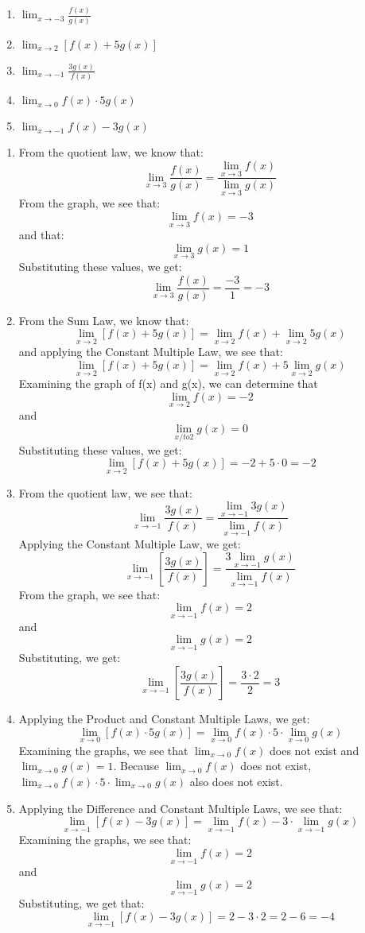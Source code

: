 \begin{Exercise}
    [title = Limits Practice 6, label=limits6]
\begin{enumerate}
    \item $\lim_{x\to-3} \frac{f(x)}{g(x)}$
    \item $\lim_{x\to2}\left[f(x) + 5g(x)\right]$
    \item $\lim_{x\to-1} \frac{3g(x)}{f(x)}$
    \item $\lim_{x\to0}f(x) \cdot 5g(x)$
    \item $\lim_{x\to-1} f(x) - 3g(x) $
\end{enumerate}
\end{Exercise}
\begin{Answer}
    [ref=limits6]
    \begin{enumerate}
        \item From the quotient law, we know that:$$\lim_{x\to3}\frac{f(x)}{g(x)}=\frac{\lim_{x\to3}f(x)}{\lim_{x\to3}g(x)}$$ From the graph, we see that: $$\lim_{x\to3}f(x) = -3$$ and that:$$\lim_{x\to3}g(x) = 1$$ Substituting these values, we get: $$\lim_{x\to3}\frac{f(x)}{g(x)}=\frac{-3}{1} = -3$$
        \item From the Sum Law, we know that: $$\lim_{x\to2}\left[f(x) + 5g(x)\right]=\lim_{x\to2}f(x) + \lim_{x\to2}5g(x)$$ and applying the Constant Multiple Law, we see that: $$\lim_{x\to2}\left[f(x) + 5g(x)\right]=\lim_{x\to2}f(x) + 5\lim_{x\to2}g(x)$$ Examining the graph of f(x) and g(x), we can determine that $$\lim_{x\to2}f(x) = -2$$ and $$\lim_{x/to2}g(x) = 0$$ Substituting these values, we get: $$\lim_{x\to2}\left[f(x) + 5g(x)\right]=-2 + 5 \cdot 0 = -2$$
        \item From the quotient law, we see that: $$\lim_{x\to-1} \frac{3g(x)}{f(x)}=\frac{\lim_{x\to-1}3g(x)}{\lim_{x\to-1}f(x)}$$ Applying the Constant Multiple Law, we get: $$\lim_{x\to-1} \left[\frac{3g(x)}{f(x)}\right]=\frac{3\lim_{x\to-1}g(x)}{\lim_{x\to-1}f(x)}$$ From the graph, we see that: $$\lim_{x\to-1}f(x) = 2$$ and $$\lim_{x\to-1}g(x) = 2$$ Substituting, we get: $$\lim_{x\to-1} \left[\frac{3g(x)}{f(x)}\right]=\frac{3 \cdot 2}{2}=3$$
        \item Applying the Product and Constant Multiple Laws, we get: $$\lim_{x\to0}\left[f(x) \cdot 5g(x)\right] = \lim_{x\to0}f(x) \cdot 5 \cdot \lim_{x\to0}g(x)$$ Examining the graphs, we see that $\lim_{x\to0}f(x)$ does not exist and $\lim_{x\to0}g(x) = 1$. Because $\lim_{x\to0}f(x)$ does not exist, $\lim_{x\to0}f(x) \cdot 5 \cdot \lim_{x\to0}g(x)$ also does not exist. 
        \item Applying the Difference and Constant Multiple Laws, we see that: $$\lim_{x\to-1} \left[f(x) - 3g(x)\right] =\lim_{x\to-1}f(x) - 3 \cdot \lim_{x\to-1}g(x)$$ Examining the graphs, we see that: $$\lim_{x\to-1}f(x) = 2$$ and $$\lim_{x\to-1}g(x) = 2$$ Substituting, we get that: $$\lim_{x\to-1} \left[f(x) - 3g(x)\right] =2 - 3 \cdot 2 = 2-6 = -4$$
    \end{enumerate}
\end{Answer}


